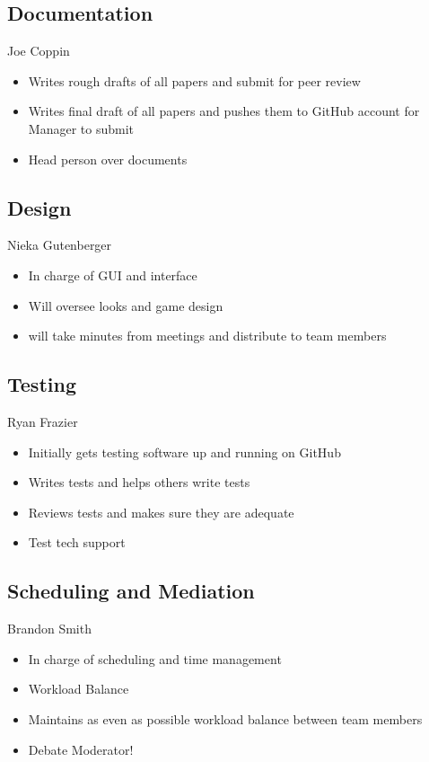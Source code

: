 \documentclass[11pt, titlepage]{article}
\begin{document}
    \subsection{Documentation}
	    Joe Coppin
    	\begin{itemize}
    		\item Writes rough drafts of all papers and submit for peer review
    		\item Writes final draft of all papers and pushes them to GitHub account for Manager to submit
    		\item Head person over documents
    	\end{itemize}
   		
    \subsection{Design}
		Nieka Gutenberger
		\begin{itemize}
			\item In charge of GUI and interface
    		\item Will oversee looks and game design
    		\item will take minutes from meetings and distribute to team members
		\end{itemize}
    	
    \subsection{Testing}
		Ryan Frazier
		\begin{itemize}
			\item Initially gets testing software up and running on GitHub
  		  	\item Writes tests and helps others write tests
    		\item Reviews tests and makes sure they are adequate
    		\item Test tech support
		\end{itemize}
   
    \subsection{Scheduling and Mediation}
	    Brandon Smith
   		\begin{itemize}
    		\item In charge of scheduling and time management
    		\item Workload Balance
    		\item Maintains as even as possible workload balance between team members
    		\item Debate Moderator!
		\end{itemize}
             
\end{document}
